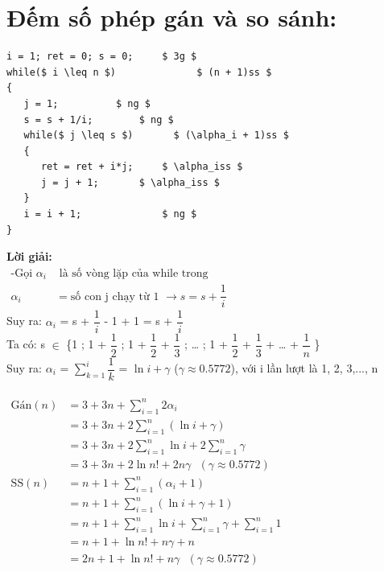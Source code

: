 \documentclass[12pt, letterpaper]{article}
\begin{document}
\section{Đếm số phép gán và so sánh:}
\begin{lstlisting}
i = 1; ret = 0; s = 0;     $ 3g $
while($ i \leq n $)        		 $ (n + 1)ss $
{
   j = 1;		   $ ng $
   s = s + 1/i;		   $ ng $
   while($ j \leq s $)		 $ (\alpha_i + 1)ss $
   {
      ret = ret + i*j;	   $ \alpha_iss $
      j = j + 1;	   $ \alpha_iss $
   }
   i = i + 1;	           $ ng $
}
\end{lstlisting}
\textbf{Lời giải:} \\
$ \begin{aligned}
		\text{-Gọi } \alpha_i & \text{ là số vòng lặp của while trong}                        &  & \\
		\alpha_i              & = \text{số con j chạy từ 1 } \rightarrow s = s + \dfrac{1}{i}
	\end{aligned} $ \\
Suy ra: $\alpha_i$ = s + $\dfrac{1}{i}$ - 1 + 1 = s + $\dfrac{1}{i}$ \\
Ta có: s $\in$ \{1 ; 1 + $\dfrac{1}{2}$ ; 1 + $\dfrac{1}{2}$ + $\dfrac{1}{3}$ ; … ; 1 + $\dfrac{1}{2}$ + $\dfrac{1}{3}$ + … + $\dfrac{1}{n}$ \} \\
Suy ra: $\alpha_i$ = $\sum_{k=1}^i \dfrac{1}{k}$ = $\ln i + \gamma$ ($\gamma \approx 0.5772$), với i lần lượt là 1, 2, 3,..., n \\
 \\
$ \begin{aligned}
		\text{Gán}(n) & = 3 + 3n + \sum_{i=1}^n 2\alpha_i                                   \\
		              & = 3 + 3n + 2\sum_{i=1}^n (\ln i + \gamma)                           \\
		              & = 3 + 3n + 2\sum_{i=1}^n \ln i + 2\sum_{i=1}^n \gamma               \\
		              & = 3 + 3n + 2\ln n! + 2n \gamma \text{ }(\gamma \approx 0.5772)      \\
        \text{SS}(n) & = n + 1 + \sum_{i=1}^n (\alpha_i + 1)                               \\
		             & = n + 1 + \sum_{i=1}^n (\ln i + \gamma + 1)                         \\
		             & = n + 1 + \sum_{i=1}^n \ln i + \sum_{i=1}^n \gamma + \sum_{i=1}^n 1 \\
		             & = n + 1 + \ln n! + n \gamma + n                                     \\
		             & = 2n + 1 + \ln n! + n \gamma \text{ }(\gamma \approx 0.5772)        \\
	\end{aligned} $ \\
\end{document}

